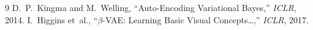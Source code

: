 \documentclass[11pt, a4paper]{article}
\begin{document}
\begin{thebibliography}{9}
  D.~P.~Kingma and M.~Welling, ``Auto-Encoding Variational Bayes,'' \textit{ICLR}, 2014.
  I.~Higgins et~al., ``$\beta$-VAE: Learning Basic Visual Concepts\ldots,'' \textit{ICLR}, 2017.
\end{thebibliography}
\end{document}
